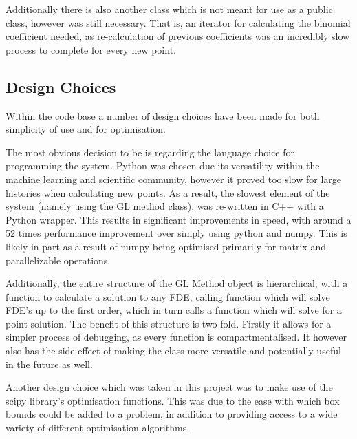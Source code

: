 Additionally there is also another class which is not meant for use as a public class, however was still necessary. That is, an iterator for calculating the binomial coefficient needed, as re-calculation of previous coefficients was an incredibly slow process to complete for every new point.

\subsection{Design Choices}

Within the code base a number of design choices have been made for both simplicity of use and for optimisation.

The most obvious decision to be is regarding the language choice for programming the system. Python was chosen due its versatility within the machine learning and scientific community, however it proved too slow for large histories when calculating new points. As a result, the slowest element of the system (namely using the GL method class), was re-written in C++ with a Python wrapper. This results in significant improvements in speed, with around a 52 times performance improvement over simply using python and numpy. This is likely in part as a result of numpy being optimised primarily for matrix and parallelizable operations.

Additionally, the entire structure of the GL Method object is hierarchical, with a function to calculate a solution to any FDE, calling function which will solve FDE's up to the first order, which in turn calls a function which will solve for a point solution. The benefit of this structure is two fold. Firstly it allows for a simpler process of debugging, as every function is compartmentalised. It however also has the side effect of making the class more versatile and potentially useful in the future as well.

Another design choice which was taken in this project was to make use of the scipy library's optimisation functions. This was due to the ease with which box bounds could be added to a problem, in addition to providing access to a wide variety of different optimisation algorithms. 
